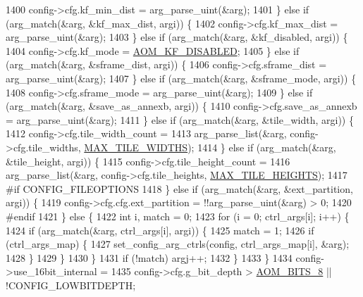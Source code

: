 \begin{DoxyCodeInclude}
{{{{{{{{{{{{{{{{{{{1400       config->cfg.kf\_min\_dist = arg\_parse\_uint(&arg);
1401     \} \textcolor{keywordflow}{else} \textcolor{keywordflow}{if} (arg\_match(&arg, &kf\_max\_dist, argi)) \{
1402       config->cfg.kf\_max\_dist = arg\_parse\_uint(&arg);
1403     \} \textcolor{keywordflow}{else} \textcolor{keywordflow}{if} (arg\_match(&arg, &kf\_disabled, argi)) \{
1404       config->cfg.kf\_mode = \hyperlink{group__encoder_ggac0498fc02cd368e6d9675cdb0bab5a84af81473ffe0169271763f9c9d05393405}{AOM\_KF\_DISABLED};
1405     \} \textcolor{keywordflow}{else} \textcolor{keywordflow}{if} (arg\_match(&arg, &sframe\_dist, argi)) \{
1406       config->cfg.sframe\_dist = arg\_parse\_uint(&arg);
1407     \} \textcolor{keywordflow}{else} \textcolor{keywordflow}{if} (arg\_match(&arg, &sframe\_mode, argi)) \{
1408       config->cfg.sframe\_mode = arg\_parse\_uint(&arg);
1409     \} \textcolor{keywordflow}{else} \textcolor{keywordflow}{if} (arg\_match(&arg, &save\_as\_annexb, argi)) \{
1410       config->cfg.save\_as\_annexb = arg\_parse\_uint(&arg);
1411     \} \textcolor{keywordflow}{else} \textcolor{keywordflow}{if} (arg\_match(&arg, &tile\_width, argi)) \{
1412       config->cfg.tile\_width\_count =
1413           arg\_parse\_list(&arg, config->cfg.tile\_widths, \hyperlink{aom__encoder_8h_a3ec4904ea175471a03d10705f384d07c}{MAX\_TILE\_WIDTHS});
1414     \} \textcolor{keywordflow}{else} \textcolor{keywordflow}{if} (arg\_match(&arg, &tile\_height, argi)) \{
1415       config->cfg.tile\_height\_count =
1416           arg\_parse\_list(&arg, config->cfg.tile\_heights, \hyperlink{aom__encoder_8h_a446aae868ff07f3971d9e84b6602a890}{MAX\_TILE\_HEIGHTS});
1417 \textcolor{preprocessor}{#if CONFIG\_FILEOPTIONS}
1418     \} \textcolor{keywordflow}{else} \textcolor{keywordflow}{if} (arg\_match(&arg, &ext\_partition, argi)) \{
1419       config->cfg.cfg.ext\_partition = !!arg\_parse\_uint(&arg) > 0;
1420 \textcolor{preprocessor}{#endif}
1421     \} \textcolor{keywordflow}{else} \{
1422       \textcolor{keywordtype}{int} i, match = 0;
1423       \textcolor{keywordflow}{for} (i = 0; ctrl\_args[i]; i++) \{
1424         \textcolor{keywordflow}{if} (arg\_match(&arg, ctrl\_args[i], argi)) \{
1425           match = 1;
1426           \textcolor{keywordflow}{if} (ctrl\_args\_map) \{
1427             set\_config\_arg\_ctrls(config, ctrl\_args\_map[i], &arg);
1428           \}
1429         \}
1430       \}
1431       \textcolor{keywordflow}{if} (!match) argj++;
1432     \}
1433   \}
1434   config->use\_16bit\_internal =
1435       config->cfg.g\_bit\_depth > \hyperlink{group__codec_gga6ed0e98eba4651c1ad845e39498e4153a4c7f55539160206a3fbb2a6cfc9ef89c}{AOM\_BITS\_8} || !CONFIG\_LOWBITDEPTH;
}}}}}}}}}}}}}}}}}}}
\end{DoxyCodeInclude}
